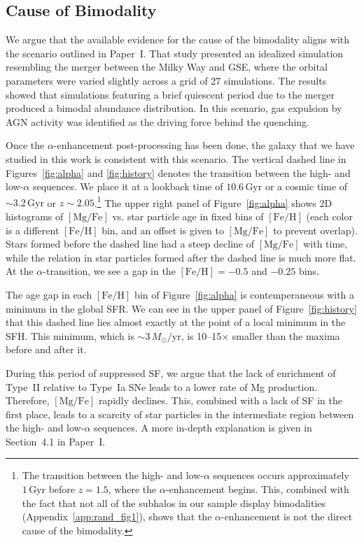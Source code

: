 \documentclass[twocolumn]{aastex631}
\newcommand{\Msun}{\ensuremath{M_{\odot}}}
\newcommand{\Gyr}{\ensuremath{\textrm{Gyr}}}
\newcommand{\FeH}{\ensuremath{[\textrm{Fe}/\textrm{H}]}}
\newcommand{\MgFe}{\ensuremath{[\textrm{Mg}/\textrm{Fe}]}}
\newcommand{\Msunyr}{\ensuremath{\Msun/\textrm{yr}}}
\begin{document}
\subsection{Cause of Bimodality}\label{ssec:bim_cause}
We argue that the available evidence for the cause of the bimodality aligns with the scenario outlined in Paper~I. That study presented an idealized simulation resembling the merger between the Milky Way and GSE, where the orbital parameters were varied slightly across a grid of 27 simulations. The results showed that simulations featuring a brief quiescent period due to the merger produced a bimodal abundance distribution. In this scenario, gas expulsion by AGN activity was identified as the driving force behind the quenching.

Once the $\alpha$-enhancement post-processing has been done, the galaxy that we have studied in this work is consistent with this scenario. The vertical dashed line in Figures~\ref{fig:alpha} and \ref{fig:history} denotes the transition between the high- and low-$\alpha$ sequences. We place it at a lookback time of $10.6\,\Gyr$ or a cosmic time of $\sim3.2\,\Gyr$ or $z\sim2.05$.\footnote{The transition between the high- and low-$\alpha$ sequences occurs approximately $1\,\Gyr$ before $z=1.5$, where the $\alpha$-enhancement begins. This, combined with the fact that not all of the subhalos in our sample display bimodalities (Appendix~\ref{app:rand_fig1}), shows that the $\alpha$-enhancement is not the direct cause of the bimodality.} The upper right panel of Figure~\ref{fig:alpha} shows 2D histograms of \MgFe{} vs. star particle age in fixed bins of \FeH{} (each color is a different \FeH{} bin, and an offset is given to \MgFe{} to prevent overlap). Stars formed before the dashed line had a steep decline of \MgFe{} with time, while the relation in star particles formed after the dashed line is much more flat. At the $\alpha$-transition, we see a gap in the $\FeH=-0.5$ and $-0.25$ bins.

The age gap in each \FeH{} bin of Figure~\ref{fig:alpha} is contemperaneous with a minimum in the global SFR. We can see in the upper panel of Figure~\ref{fig:history} that this dashed line lies almost exactly at the point of a local minimum in the SFH. This minimum, which is $\sim3\,\Msunyr$, is 10--15$\times$ smaller than the maxima before and after it.

During this period of suppressed SF, we argue that the lack of enrichment of Type~II relative to Type~Ia SNe leads to a lower rate of Mg production. Therefore, \MgFe{} rapidly declines. This, combined with a lack of SF in the first place, leads to a scarcity of star particles in the intermediate region between the high- and low-$\alpha$ sequences. A more in-depth explanation is given in Section~4.1 in Paper~I.
\end{document}
